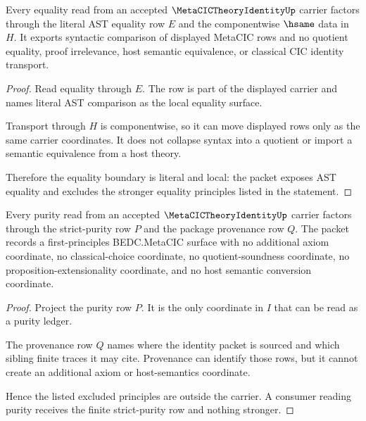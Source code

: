 \begin{theorem}
\label{thm:metacic-theory-identity-literal-equality-boundary}
Every equality read from an accepted $\MetaCICTheoryIdentityUp$ carrier factors through the literal AST equality row $E$ and the componentwise $\hsame$ data in $H$. It exports syntactic comparison of displayed MetaCIC rows and no quotient equality, proof irrelevance, host semantic equivalence, or classical CIC identity transport.
\end{theorem}
\begin{proof}
Read equality through $E$. The row is part of the displayed carrier and names literal AST comparison as the local equality surface.

Transport through $H$ is componentwise, so it can move displayed rows only as the same carrier coordinates. It does not collapse syntax into a quotient or import a semantic equivalence from a host theory.

Therefore the equality boundary is literal and local: the packet exposes AST equality and excludes the stronger equality principles listed in the statement.
\end{proof}

\begin{theorem}
\label{thm:metacic-theory-identity-purity-boundary}
Every purity read from an accepted $\MetaCICTheoryIdentityUp$ carrier factors through the strict-purity row $P$ and the package provenance row $Q$. The packet records a first-principles BEDC.MetaCIC surface with no additional axiom coordinate, no classical-choice coordinate, no quotient-soundness coordinate, no proposition-extensionality coordinate, and no host semantic conversion coordinate.
\end{theorem}
\begin{proof}
Project the purity row $P$. It is the only coordinate in $I$ that can be read as a purity ledger.

The provenance row $Q$ names where the identity packet is sourced and which sibling finite traces it may cite. Provenance can identify those rows, but it cannot create an additional axiom or host-semantics coordinate.

Hence the listed excluded principles are outside the carrier. A consumer reading purity receives the finite strict-purity row and nothing stronger.
\end{proof}

